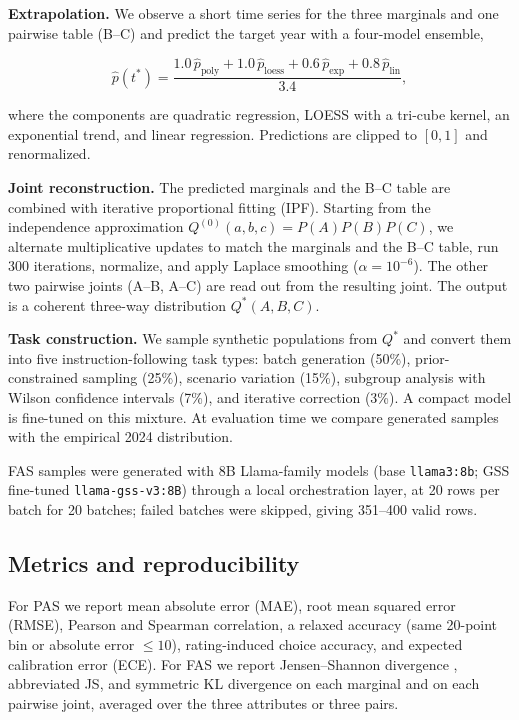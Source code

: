 \textbf{Extrapolation.} We observe a short time series for the three
marginals and one pairwise table (B--C) and predict the target year with
a four-model ensemble,

\[
\hat p(t^{\ast}) =
\frac{1.0\,\hat p_{\text{poly}}+1.0\,\hat p_{\text{loess}}+0.6\,\hat p_{\text{exp}}+0.8\,\hat p_{\text{lin}}}{3.4},
\]

where the components are quadratic regression, LOESS with a tri-cube
kernel, an exponential trend, and linear regression. Predictions are
clipped to \([0,1]\) and renormalized.

\textbf{Joint reconstruction.} The predicted marginals and the B--C
table are combined with iterative proportional fitting (IPF). Starting
from the independence approximation \(Q^{(0)}(a,b,c)=P(A)P(B)P(C)\), we
alternate multiplicative updates to match the marginals and the B--C
table, run 300 iterations, normalize, and apply Laplace smoothing
(\(\alpha=10^{-6}\)). The other two pairwise joints (A--B, A--C) are
read out from the resulting joint. The output is a coherent three-way
distribution \(Q^{\ast}(A,B,C)\).

\textbf{Task construction.} We sample synthetic populations from
\(Q^{\ast}\) and convert them into five instruction-following task
types: batch generation (50\%), prior-constrained sampling (25\%),
scenario variation (15\%), subgroup analysis with Wilson confidence
intervals (7\%), and iterative correction (3\%). A compact model is
fine-tuned on this mixture. At evaluation time we compare generated
samples with the empirical 2024 distribution.

FAS samples were generated with 8B Llama-family models (base
\texttt{llama3:8b}; GSS fine-tuned \texttt{llama-gss-v3:8B}) through a
local orchestration layer, at 20 rows per batch for 20 batches; failed
batches were skipped, giving 351--400 valid rows.

\subsection{Metrics and
reproducibility}\label{metrics-and-reproducibility}

For PAS we report mean absolute error (MAE), root mean squared error
(RMSE), Pearson and Spearman correlation, a relaxed accuracy (same
20-point bin or absolute error \(\le 10\)), rating-induced choice
accuracy, and expected calibration error (ECE). For FAS we report
Jensen--Shannon divergence \citep{lin1991js}, abbreviated JS, and
symmetric KL divergence on each marginal and on each pairwise joint,
averaged over the three attributes or three pairs.

